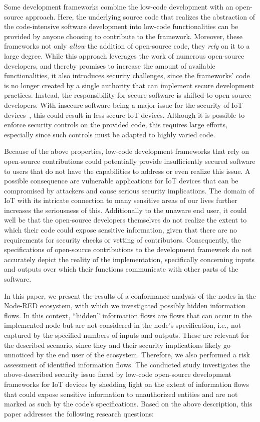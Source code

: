 Some development frameworks combine the low-code development with an open-source approach.
Here, the underlying source code that realizes the abstraction of the code-intensive software development into low-code functionalities can be provided by anyone choosing to contribute to the framework.
Moreover, these frameworks not only \textit{allow} the addition of open-source code, they \textit{rely} on it to a large degree.
While this approach leverages the work of numerous open-source developers, and thereby promises to increase the amount of available functionalities, it also introduces security challenges, since the frameworks' code is no longer created by a single authority that can implement secure development practices.
Instead, the responsibility for secure software is shifted to open-source developers.
With insecure software being a major issue for the security of IoT devices~\cite{HaddadPajouh21_security_iot}, this could result in less secure IoT devices.
Although it is possible to enforce security controls on the provided code, this requires large efforts, especially since such controls must be adapted to highly varied code.

Because of the above properties, low-code development frameworks that rely on open-source contributions could potentially provide insufficiently secured software to users that do not have the capabilities to address or even realize this issue.
A possible consequence are vulnerable applications for IoT devices that can be compromised by attackers and cause serious security implications.
The domain of IoT with its intricate connection to many sensitive areas of our lives further increases the seriousness of this.
Additionally to the unaware end user, it could well be that the open-source developers themselves do not realize the extent to which their code could expose sensitive information, given that there are no requirements for security checks or vetting of contributors.
Consequently, the specifications of open-source contributions to the development framework do not accurately depict the reality of the implementation, specifically concerning inputs and outputs over which their functions communicate with other parts of the software.


In this paper, we present the results of a conformance analysis of the nodes in the Node-RED ecosystem, with which we investigated possibly hidden information flows.
In this context, ``hidden'' information flows are flows that can occur in the implemented node but are not considered in the node's specification, i.e., not captured by the specified numbers of inputs and outputs.
These are relevant for the described scenario, since they and their security implications likely go unnoticed by the end user of the ecosystem.
Therefore, we also performed a risk assessment of identified information flows.
The conducted study investigates the above-described security issue faced by low-code open-source development frameworks for IoT devices by shedding light on the extent of information flows that could expose sensitive information to unauthorized entities and are not marked as such by the code's specifications.
%
Based on the above description, this paper addresses the following research questions:


